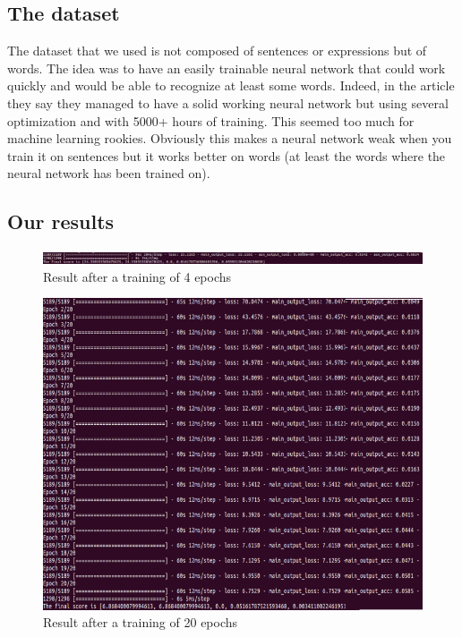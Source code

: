 \documentclass[12pt]{article}
\begin{document}
\subsection{The dataset}

The dataset that we used is not composed of sentences or expressions but of words. The idea was to have an easily trainable neural network that could work quickly and would be able to recognize at least some words. Indeed, in the article they say they managed to have a solid working neural network but using several optimization and with 5000+ hours of training. This seemed too much for machine learning rookies. Obviously this makes a neural network weak when you train it on sentences but it works better on words (at least the words where the neural network has been trained on).

\subsection{Our results}

\begin{figure}[H]
  \begin{center}
    \includegraphics[scale=0.4]{images/image2.png}
    \caption{Result after a training of 4 epochs}
  \end{center}
\end{figure}


\begin{figure}[H]
  \begin{center}
    \includegraphics[scale=0.80]{images/image3.png}
    \caption{Result after a training of 20 epochs}
  \end{center}
\end{figure}
\end{document}
